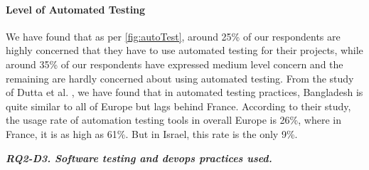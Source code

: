 \paragraph{Level of Automated Testing}
We have found that as per \ref{fig:autoTest}, around 25\% of our respondents are highly concerned that they have to use automated testing for their projects, while around 35\% of our respondents have expressed medium level concern and the remaining are hardly concerned about using automated testing. From the study of Dutta et al. \citep{dutta1999}, we have found that in automated testing practices, Bangladesh is quite similar to all of Europe but lags behind France. According to their study, the usage rate of automation testing tools in overall Europe is 26\%, where in France, it is as high as 61\%. But in Israel, this rate is the only 9\%.

\begin{tcolorbox}[flushleft upper,boxrule=1pt,arc=0pt,left=0pt,right=0pt,top=0pt,bottom=0pt,colback=white,after=\ignorespacesafterend\par\noindent]
\nd\it{\bf{RQ2-D3. Software testing and devops practices used.}} 

\end{tcolorbox}
